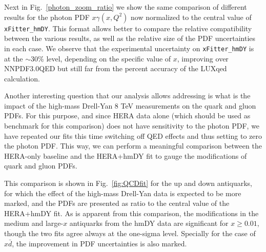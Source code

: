 Next in Fig.~\ref{photon_zoom_ratio} we show the same comparison of different
results for the photon PDF $x\gamma(x,Q^2)$ now normalized to the central value of {\tt xFitter\_hmDY}.
%
This format allows better to compare the relative compatibility between the various results,
as well as the relative size of the PDF uncertainties in each case.
%
We observe that the experimental uncertainty on {\tt xFitter\_hmDY} is at the $\sim 30\%$ level,
depending on the specific value of $x$, improving over NNPDF3.0QED but still far from the
percent accuracy of the LUXqed calculation.


Another interesting question that our analysis allows addressing is what is
the impact of the high-mass Drell-Yan 8 TeV measurements on the quark and gluon
PDFs.
%
For this purpose, and since HERA data alone (which should be used as benchmark for
this comparison) does not have sensitivity to the photon PDF,
we have repeated our fits this time switching off QED effects and thus setting to zero
the photon PDF.
%
This way, we can perform a meaningful comparison between the HERA-only baseline and the
HERA+hmDY fit to gauge the modifications of quark and gluon PDFs.

This comparison is shown in Fig.~\ref{fig:QCDfit} for the up and down antiquarks,
for which the effect of the high-mass
Drell-Yan data is expected to be more marked, and the PDFs are presented
as ratio to the central value of the HERA+hmDY fit.
%
As is apparent from this comparison, the modifications in the medium and large-$x$
antiquarks from the hmDY data are significant for $x\ge 0.01$, though the two fits
agree always at the one-sigma level.
%
Specially for the case of $x\bar{d}$, the improvement in PDF uncertainties
is also marked.

